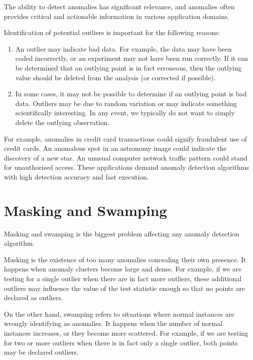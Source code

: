 The ability to detect anomalies has significant relevance, and anomalies often provides critical and actionable information in various application domains.

Identification of potential outliers is important for the following reasons: \cite{EngineeringStatsHandbook}

\begin{enumerate}
    \item An outlier may indicate bad data.
    For example, the data may have been coded incorrectly, or an experiment may not have been run correctly.
    If it can be determined that an outlying point is in fact erroneous, then the outlying value should be deleted from the analysis (or corrected if possible).
    \item In some cases, it may not be possible to determine if an outlying point is bad data.
    Outliers may be due to random variation or may indicate something scientifically interesting.
    In any event, we typically do not want to simply delete the outlying observation.
\end{enumerate}

For example, anomalies in credit card transactions could signify fraudulent use of credit cards.
An anomalous spot in an astronomy image could indicate the discovery of a new star.
An unusual computer network traffic pattern could stand for unauthorised access.
These applications demand anomaly detection algorithms with high detection accuracy and fast execution.

\section{Masking and Swamping}
\label{sec:masking-and-swamping-definition}

Masking and swamping is the biggest problem affecting any anomaly detection algorithm.

Masking is the existence of too many anomalies concealing their own presence.
It happens when anomaly clusters become large and dense.
For example, if we are testing for a single outlier when there are in fact more outliers, these additional outliers may influence the value of the test statistic enough so that no points are declared as outliers.

On the other hand, swamping refers to situations where normal instances are wrongly identifying as anomalies.
It happens when the number of normal instances increases, or they become more scattered.
For example, if we are testing for two or more outliers when there is in fact only a single outlier, both points may be declared outliers.

